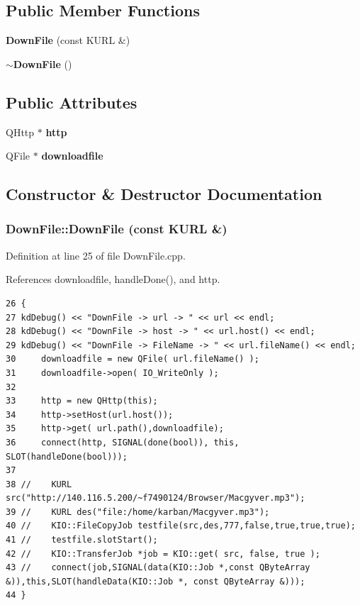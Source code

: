 \subsection*{Public Member Functions}
\begin{CompactItemize}
\item 
{\bf Down\-File} (const KURL \&)
\item 
{\bf $\sim$Down\-File} ()
\end{CompactItemize}
\subsection*{Public Attributes}
\begin{CompactItemize}
\item 
QHttp $\ast$ {\bf http}
\item 
QFile $\ast$ {\bf downloadfile}
\end{CompactItemize}


\subsection{Constructor \& Destructor Documentation}
\subsubsection{\setlength{\rightskip}{0pt plus 5cm}Down\-File::Down\-File (const KURL \&)}\label{classDownFile_DownFilea0}




Definition at line 25 of file Down\-File.cpp.

References downloadfile, handle\-Done(), and http.



\footnotesize\begin{verbatim}26 {  
27 kdDebug() << "DownFile -> url -> " << url << endl;
28 kdDebug() << "DownFile -> host -> " << url.host() << endl;      
29 kdDebug() << "DownFile -> FileName -> " << url.fileName() << endl;    
30     downloadfile = new QFile( url.fileName() );
31     downloadfile->open( IO_WriteOnly );
32     
33     http = new QHttp(this);
34     http->setHost(url.host());
35     http->get( url.path(),downloadfile); 
36     connect(http, SIGNAL(done(bool)), this, SLOT(handleDone(bool)));  
37     
38 //    KURL src("http://140.116.5.200/~f7490124/Browser/Macgyver.mp3");
39 //    KURL des("file:/home/karban/Macgyver.mp3");
40 //    KIO::FileCopyJob testfile(src,des,777,false,true,true,true);
41 //    testfile.slotStart();
42 //    KIO::TransferJob *job = KIO::get( src, false, true );
43 //    connect(job,SIGNAL(data(KIO::Job *,const QByteArray &)),this,SLOT(handleData(KIO::Job *, const QByteArray &)));
44 }
\end{verbatim}\normalsize 
{}
